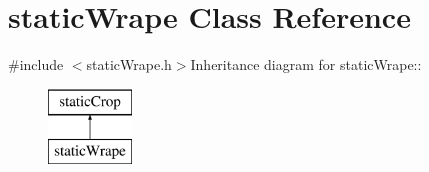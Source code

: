 \hypertarget{classstatic_wrape}{
\section{staticWrape Class Reference}
\label{classstatic_wrape}
}


{\ttfamily \#include $<$staticWrape.h$>$}Inheritance diagram for staticWrape::\begin{figure}[H]
\begin{center}
\leavevmode
\includegraphics[height=2cm]{classstatic_wrape}
\end{center}
\end{figure}
